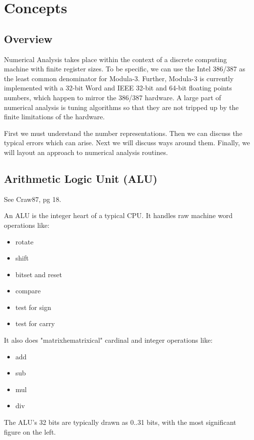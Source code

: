\section{Concepts}

\subsection{Overview}
Numerical Analysis takes place within the context of a
discrete computing machine with finite register sizes.  To
be specific, we can use the Intel 386/387 as the least
common denominator for Modula-3.  Further, Modula-3 is
currently implemented with a 32-bit Word and IEEE 32-bit and
64-bit floating points numbers, which happen to mirror the
386/387 hardware.  A large part of numerical analysis is
tuning algorithms so that they are not tripped up by the
finite limitations of the hardware.

First we must understand the number representations.  Then
we can discuss the typical errors which can arise.  Next we
will discuss ways around them.  Finally, we will layout an
approach to numerical analysis routines.

\subsection{Arithmetic Logic Unit (ALU)}
See Craw87, pg 18.

An ALU is the integer heart of a typical CPU.  It handles
raw machine word operations like:
\begin{itemize}
   \item  rotate
   \item  shift
   \item  bitset and reset
   \item  compare
   \item  test for sign
   \item  test for carry
\end{itemize}

It also does "matrixhematrixical" cardinal and integer operations
like:
\begin{itemize}
   \item  add
   \item  sub
   \item  mul
   \item  div
\end{itemize}
     
The ALU's 32 bits are typically drawn as 0..31 bits, with
the most significant figure on the left.

